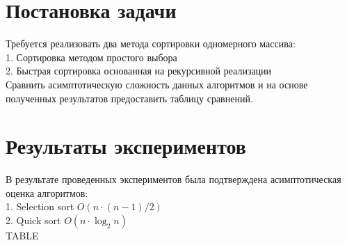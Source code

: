 \documentclass[a4paper,12pt]{article}
\begin{document}
    \section{Постановка задачи}
    Требуется реализовать два метода сортировки одномерного массива: \\
    1. Сортировка методом простого выбора \\
    2. Быстрая сортировка основанная на рекурсивной реализации\\ 
    Сравнить асимптотическую сложность данных алгоритмов и на основе полученных результатов предоставить таблицу сравнений.

    \newpage
    \section{Результаты экспериментов}
    В результате проведенных экспериментов была подтверждена асимптотическая
    оценка алгоритмов: \\
    1. Selection sort $O(n\cdot(n-1)/2)$ \\
    2. Quick sort $O(n\cdot\log_2n)$\\

    TABLE
\end{document}

